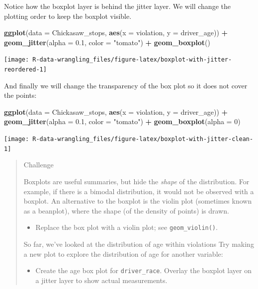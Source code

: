 \documentclass[]{book}
\newenvironment{Shaded}{\begin{snugshade}}{\end{snugshade}}
\newcommand{\KeywordTok}[1]{\textcolor[rgb]{0.13,0.29,0.53}{\textbf{#1}}}
\newcommand{\DataTypeTok}[1]{\textcolor[rgb]{0.13,0.29,0.53}{#1}}
\newcommand{\DecValTok}[1]{\textcolor[rgb]{0.00,0.00,0.81}{#1}}
\newcommand{\FloatTok}[1]{\textcolor[rgb]{0.00,0.00,0.81}{#1}}
\newcommand{\StringTok}[1]{\textcolor[rgb]{0.31,0.60,0.02}{#1}}
\newcommand{\OperatorTok}[1]{\textcolor[rgb]{0.81,0.36,0.00}{\textbf{#1}}}
\newcommand{\NormalTok}[1]{#1}
\providecommand{\tightlist}{%
  \setlength{\itemsep}{0pt}\setlength{\parskip}{0pt}}
\theoremstyle{definition}
\theoremstyle{definition}
\theoremstyle{definition}
\theoremstyle{remark}
\begin{document}
Notice how the boxplot layer is behind the jitter layer. We will change
the plotting order to keep the boxplot visible.

\begin{Shaded}
\begin{Highlighting}[]
\KeywordTok{ggplot}\NormalTok{(}\DataTypeTok{data =}\NormalTok{ Chickasaw_stops, }\KeywordTok{aes}\NormalTok{(}\DataTypeTok{x =}\NormalTok{ violation, }\DataTypeTok{y =}\NormalTok{ driver_age)) }\OperatorTok{+}
\StringTok{    }\KeywordTok{geom_jitter}\NormalTok{(}\DataTypeTok{alpha =} \FloatTok{0.1}\NormalTok{, }\DataTypeTok{color =} \StringTok{"tomato"}\NormalTok{) }\OperatorTok{+}\StringTok{ }
\StringTok{    }\KeywordTok{geom_boxplot}\NormalTok{()}
\end{Highlighting}
\end{Shaded}

\texttt{[image: R-data-wrangling\_files/figure-latex/boxplot-with-jitter-reordered-1]}

And finally we will change the transparency of the box plot so it does
not cover the points:

\begin{Shaded}
\begin{Highlighting}[]
\KeywordTok{ggplot}\NormalTok{(}\DataTypeTok{data =}\NormalTok{ Chickasaw_stops, }\KeywordTok{aes}\NormalTok{(}\DataTypeTok{x =}\NormalTok{ violation, }\DataTypeTok{y =}\NormalTok{ driver_age)) }\OperatorTok{+}
\StringTok{    }\KeywordTok{geom_jitter}\NormalTok{(}\DataTypeTok{alpha =} \FloatTok{0.1}\NormalTok{, }\DataTypeTok{color =} \StringTok{"tomato"}\NormalTok{) }\OperatorTok{+}
\StringTok{    }\KeywordTok{geom_boxplot}\NormalTok{(}\DataTypeTok{alpha =} \DecValTok{0}\NormalTok{)  }
\end{Highlighting}
\end{Shaded}

\texttt{[image: R-data-wrangling\_files/figure-latex/boxplot-with-jitter-clean-1]}

\begin{quote}
Challenge

Boxplots are useful summaries, but hide the \emph{shape} of the
distribution. For example, if there is a bimodal distribution, it would
not be observed with a boxplot. An alternative to the boxplot is the
violin plot (sometimes known as a beanplot), where the shape (of the
density of points) is drawn.

\begin{itemize}
\tightlist
\item
  Replace the box plot with a violin plot; see \texttt{geom\_violin()}.
\end{itemize}

So far, we've looked at the distribution of age within violations Try
making a new plot to explore the distribution of age for another
variable:

\begin{itemize}
\tightlist
\item
  Create the age box plot for \texttt{driver\_race}. Overlay the boxplot
  layer on a jitter layer to show actual measurements.
\end{itemize}
\end{quote}
\end{document}
